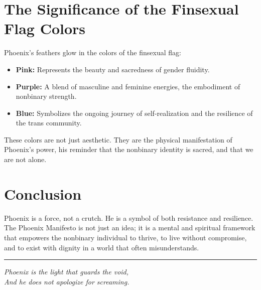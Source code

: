 \documentclass[12pt]{article}
\begin{document}
\section*{The Significance of the Finsexual Flag Colors}

Phoenix’s feathers glow in the colors of the finsexual flag:  

\begin{itemize}
  \item \textbf{Pink:} Represents the beauty and sacredness of gender fluidity.
  \item \textbf{Purple:} A blend of masculine and feminine energies, the embodiment of nonbinary strength.
  \item \textbf{Blue:} Symbolizes the ongoing journey of self-realization and the resilience of the trans community.
\end{itemize}

These colors are not just aesthetic. They are the physical manifestation of Phoenix’s power, his reminder that the nonbinary identity is sacred, and that we are not alone.

\section*{Conclusion}

Phoenix is a force, not a crutch. He is a symbol of both resistance and resilience. The Phoenix Manifesto is not just an idea; it is a mental and spiritual framework that empowers the nonbinary individual to thrive, to live without compromise, and to exist with dignity in a world that often misunderstands.

\begin{center}
\rule{0.5\textwidth}{0.4pt}
\end{center}

\begin{center}
\textit{Phoenix is the light that guards the void,\\
And he does not apologize for screaming.}
\end{center}
\end{document}
